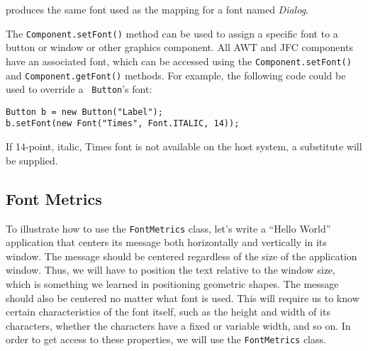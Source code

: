 \noindent produces the same font used as the mapping for a
font named {\em Dialog}.


The {\tt Component.setFont()} method can be used to assign a specific
font to a button or window or other graphics component.  All AWT and
JFC components have an associated font, which can be accessed using
the {\tt Component.setFont()} and {\tt Component.getFont()} methods.
For example, the following code could be used to override a {\tt
Button}'s font:

\begin{jjjlisting}
\begin{lstlisting}
Button b = new Button("Label");
b.setFont(new Font("Times", Font.ITALIC, 14));
\end{lstlisting}
\end{jjjlisting}

\noindent If 14-point, italic, Times font is not available on the
host system, a substitute will be supplied.

\subsection{Font Metrics}
\noindent To illustrate how to use the {\tt FontMetrics} class, let's write a
``Hello World'' application that centers its message both horizontally and
vertically in its window.  The message should be centered
regardless of the size of the application window.  Thus, we will have to
position the text relative to the window size, which is something we
learned in positioning geometric shapes.   The message
should also be centered no matter what font is used.  This will require
us to know certain characteristics of the font itself, such as the
height and width of its characters, whether the characters have a
fixed or variable width, and so on.  In order to get access to
these properties, we will use the {\tt FontMetrics} class.


